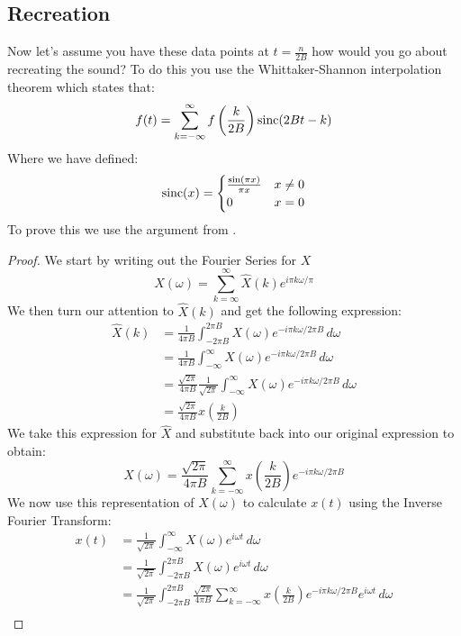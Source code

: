 \documentclass [../article.tex]{subfiles}
\begin{document}
  \subsection{Recreation}
  Now let's assume you have these data points at $t=\frac{n}{2B}$
  how would you go about recreating the sound? To do this you use
  the Whittaker-Shannon interpolation theorem which states that:
  \[f(t) = \sum_{k=-\infty}^\infty f\left(\frac{k}{2B}\right)\operatorname{sinc}(2Bt-k)\]
  Where we have defined:
  \[\operatorname{sinc}(x) = \begin{cases}
                  \frac{\sin(\pi x)}{\pi x} & x \neq 0\\
                  0 & x = 0
                \end{cases} \]
  To prove this we use the argument from \cite{vrscay_2008}.
  \begin{proof}
    We start by writing out the Fourier Series for $X$
    \[X(\omega)=\sum_{k=\infty}^\infty\hat{X}(k)e^{i\pi k\omega/\pi}\]
    We then turn our attention to $\hat{X}(k)$ and get the following
    expression:
    \begin{align*}
      \hat{X}(k) &= \frac{1}{{4\pi B}}\int_{-{2\pi B}}^{2\pi B} X(\omega)
      e^{-i\pi k \omega/{2\pi B}}\,d\omega\\
      {} &= \frac{1}{{4\pi B}}\int_{-\infty}^\infty X(\omega)
      e^{-i\pi k \omega/{2\pi B}}\,d\omega\\
      {} &= \frac{\sqrt{2\pi}}{{4\pi B}}\frac{1}{\sqrt{2\pi}}
      \int_{-\infty}^\infty X(\omega) e^{-i\pi k \omega/{2\pi B}}\,d\omega\\
      {} &= \frac{\sqrt{2\pi}}{{4\pi B}}x\left(\frac{k}{2B}\right)
    \end{align*}
    We take this expression for $\hat{X}$ and substitute back
    into our original expression to obtain:
    \[ X(\omega) = \frac{\sqrt{2\pi}}{{4\pi B}}\sum_{k=-\infty}^\infty
    x\left(\frac{k}{2B}\right)e^{-i\pi k\omega/{2\pi B}}\]
    We now use this representation of $X(\omega)$ to calculate
    $x(t)$ using the Inverse Fourier Transform:
    \begin{align*}
      x(t) &= \frac{1}{\sqrt{2\pi}}\int_{-\infty}^\infty X(\omega) e^{i\omega t}\,d\omega\\
      {} &= \frac{1}{\sqrt{2\pi}}\int_{-{2\pi B}}^{2\pi B} X(\omega) e^{i\omega t}\,d\omega\\
      {} &= \frac{1}{\sqrt{2\pi}}\int_{-{2\pi B}}^{2\pi B} \frac{\sqrt{2\pi}}{{4\pi B}}\sum_{k=-\infty}^\infty
      x\left(\frac{k}{2B}\right)e^{-i\pi k\omega/{2\pi B}} e^{i\omega t}\,d\omega\\

\end{align*}
\end{proof}
\end{document}
